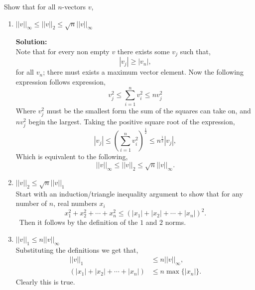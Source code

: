 \documentclass[12pt]{article}
\makeatletter
\theoremstyle{homework}
\newenvironment{exercise}[1]
{\def\@currentlabel{#1}\exercisecore}
{\endexercisecore}
\newcommand{\localhead}[1]{\par\smallskip\noindent\textbf{#1}\nobreak\\}%
\newcommand\solution{\localhead{Solution:}}
\makeatother
\begin{document}
\begin{exercise}{Exercise 7.10} Show that for all $n$-vectors $v$,\\

  \begin{enumerate}
    \item $||v||_{\infty} \le ||v||_{2} \le \sqrt{n}||v||_{\infty}$
    \solution Note that for every non empty $v$ there exists some $v_j$ such that,
    \begin{equation*}
      |v_j| \geq |v_n|,
    \end{equation*}
    for all $v_n$; there must exists a maximum vector element. Now the following expression follows expression,
    \begin{equation*}
      v_j^2 \le \sum_{i = 1}^n v_i^2 \le nv_j^2 
    \end{equation*}
    Where $v_j^2$ must be the smallest form the sum of the squares can take on, and $nv_j^2$ begin the largest. Taking the positive square root of the 
    expression,  
    \begin{equation*}
      |v_j| \le (\sum_{i = 1}^n v_i^2)^{\frac{1}{2}} \le n^{\frac{1}{2}}|v_j|, 
    \end{equation*}
    Which is equivalent to the following,
    \begin{equation*}
      ||v||_{\infty} \le ||v||_{2} \le \sqrt{n}||v||_{\infty}.
    \end{equation*}
     \vspace{.25in}

     \item $||v||_{2} \le \sqrt{n}||v||_{1}$\\
     Start with an induction/triangle inequality argument to show that for any number of $n$, real numbers $x_i$
     \begin{equation*}
       x_1^2 + x_2^2 + \cdots + x_n^2 \le (|x_1| + |x_2| + \cdots + |x_n|)^2.
     \end{equation*}\
     Then it follows by the definition of the $1$ and $2$ norms. 
     \vspace{.25in}
    
     \item $||v||_{1} \le n||v||_{\infty}$\\
     Substituting the definitions we get that,
     \begin{align*}
      ||v||_{1} &\le n||v||_{\infty},\\
      (|x_1| + |x_2| + \cdots + |x_n|) &\le n \max\{|x_n|\}.
     \end{align*}
     Clearly this is true.
  \end{enumerate}
  
\end{exercise}
\vspace{.5in}
\end{document}
